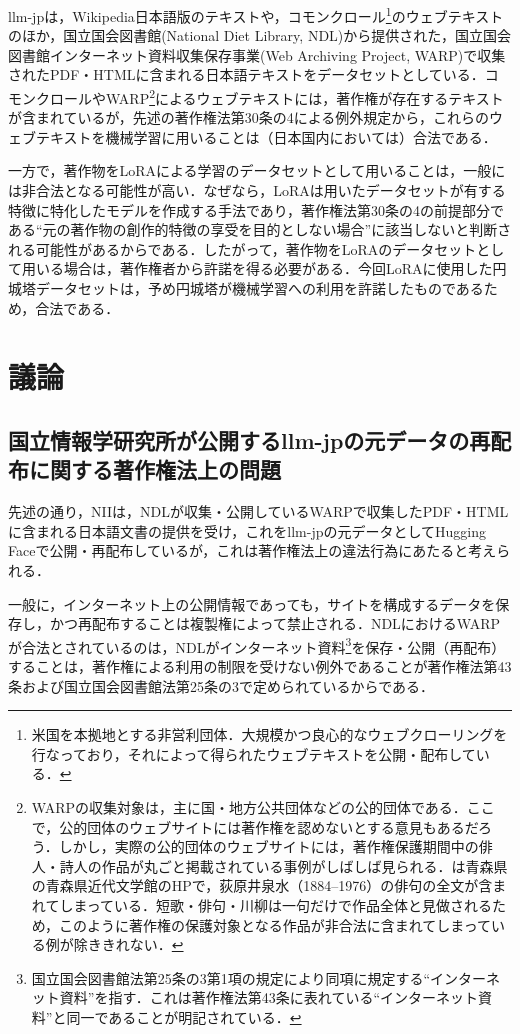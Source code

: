 \documentclass[10pt, a5paper, twoside]{jsarticle}
\theoremstyle{definition}
\begin{document}
			llm-jpは，Wikipedia日本語版のテキストや，コモンクロール\footnote{米国を本拠地とする非営利団体．大規模かつ良心的なウェブクローリングを行なっており，それによって得られたウェブテキストを公開・配布している．}のウェブテキストのほか，国立国会図書館(National Diet Library, NDL)から提供された，国立国会図書館インターネット資料収集保存事業(Web Archiving Project, WARP)で収集されたPDF・HTMLに含まれる日本語テキストをデータセットとしている．コモンクロールやWARP\footnote{WARPの収集対象は，主に国・地方公共団体などの公的団体である．ここで，公的団体のウェブサイトには著作権を認めないとする意見もあるだろう．しかし，実際の公的団体のウェブサイトには，著作権保護期間中の俳人・詩人の作品が丸ごと掲載されている事例がしばしば見られる．\cite{aomr}は青森県の青森県近代文学館のHPで，荻原井泉水（1884--1976）の俳句の全文が含まれてしまっている．短歌・俳句・川柳は一句だけで作品全体と見做されるため，このように著作権の保護対象となる作品が非合法に含まれてしまっている例が除ききれない．}によるウェブテキストには，著作権が存在するテキストが含まれているが，先述の著作権法第30条の4による例外規定から，これらのウェブテキストを機械学習に用いることは（日本国内においては）合法である．

			一方で，著作物をLoRAによる学習のデータセットとして用いることは，一般には非合法となる可能性が高い．なぜなら，LoRAは用いたデータセットが有する特徴に特化したモデルを作成する手法であり，著作権法第30条の4の前提部分である“元の著作物の創作的特徴の享受を目的としない場合”に該当しないと判断される可能性があるからである．したがって，著作物をLoRAのデータセットとして用いる場合は，著作権者から許諾を得る必要がある．今回LoRAに使用した円城塔データセットは，予め円城塔が機械学習への利用を許諾したものであるため，合法である．

	\section{議論}

		 \subsection{国立情報学研究所が公開するllm-jpの元データの再配布に関する著作権法上の問題}

		 	先述の通り，NIIは，NDLが収集・公開しているWARPで収集したPDF・HTMLに含まれる日本語文書の提供を受け，これをllm-jpの元データとしてHugging Faceで公開・再配布しているが，これは著作権法上の違法行為にあたると考えられる．

		 	一般に，インターネット上の公開情報であっても，サイトを構成するデータを保存し，かつ再配布することは複製権によって禁止される．NDLにおけるWARPが合法とされているのは，NDLがインターネット資料\footnote{国立国会図書館法第25条の3第1項の規定により同項に規定する“インターネット資料”を指す．これは著作権法第43条に表れている“インターネット資料”と同一であることが明記されている．}を保存・公開（再配布）することは，著作権による利用の制限を受けない例外であることが著作権法第43条および国立国会図書館法第25条の3で定められているからである．
\end{document}
